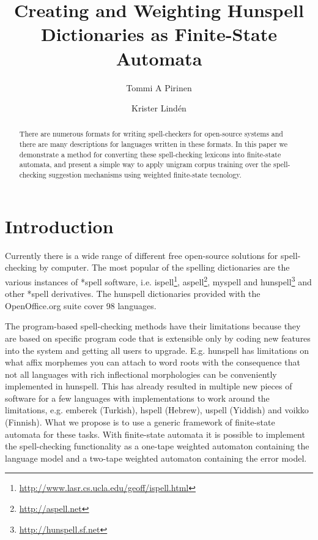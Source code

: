 \documentclass[a4paper,runningheads]{llncs}
\begin{document}
\mainmatter

\title{Creating and Weighting Hunspell Dictionaries as Finite-State Automata}


\author{Tommi A Pirinen \and Krister Lind\'{e}n}



\maketitle

\begin{abstract}
  There are numerous formats for writing spell-checkers for
  open-source systems and there are many descriptions for languages
  written in these formats. In this paper we
  demonstrate a method for converting these spell-checking lexicons
  into finite-state automata, and present a simple way to apply unigram
  corpus training over the spell-checking suggestion mechanisms using
  weighted finite-state tecnology.
\end{abstract}


\section{Introduction}
\label{sec:introduction}

Currently there is a wide range of different free open-source
solutions for spell-checking by computer. The most popular of the spelling
dictionaries are the various instances of *spell software, i.e.
ispell\footnote{\url{http://www.lasr.cs.ucla.edu/geoff/ispell.html}},
aspell\footnote{\url{http://aspell.net}}, myspell and
hunspell\footnote{\url{http://hunspell.sf.net}} and other *spell
derivatives. The hunspell dictionaries
provided with the OpenOffice.org suite cover 98 languages.

The program-based spell-checking methods have their limitations
because they are based on specific program code that is extensible
only by coding new features into the system and getting all users to
upgrade. E.g. hunspell has limitations on what affix morphemes you can
attach to word roots with the consequence that not all languages with
rich inflectional morphologies can be conveniently implemented in
hunspell. This has already resulted in multiple new pieces of software
for a few languages with implementations to work around the
limitations, e.g.  emberek (Turkish), hspell (Hebrew), uspell
(Yiddish) and voikko (Finnish). What we propose is to use a generic
framework of finite-state automata for these tasks. With finite-state
automata it is possible to implement the spell-checking functionality
as a one-tape weighted automaton containing the language model and a
two-tape weighted automaton containing the error model.
\end{document}
